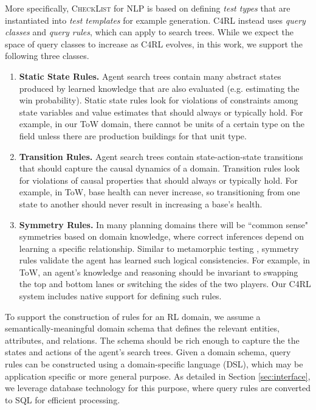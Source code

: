 \documentclass[letterpaper]{article} %
\begin{document}
More specifically, \textsc{CheckList} for NLP is based on defining \emph{test types} that are instantiated into \emph{test templates} for example generation. C4RL instead uses \emph{query classes} and \emph{query rules}, which can apply to search trees. While we expect the space of query classes to increase as C4RL evolves, in this work, we support the following three classes.
\label{sec:query-class}
\begin{enumerate}[itemsep=0pt,topsep=1pt]
    \item 
        \textbf{Static State Rules.} Agent search trees contain many abstract states produced by learned knowledge that are also evaluated 
        (e.g. estimating the win probability). Static state rules look for violations of constraints among state variables and value estimates that should always or typically hold. For example, in our ToW domain, there cannot be units of a certain type on the field unless there are production buildings for that unit type. 
    \item 
        \textbf{Transition Rules.} Agent search trees contain state-action-state transitions that should capture the causal dynamics of a domain. Transition rules look for violations of causal properties that should always or typically hold. For example, in ToW, base health can never increase, so transitioning from one state to another should never result in increasing a base's health. 
    \item
        \textbf{Symmetry Rules.} In many planning domains there will be ``common sense" symmetries based on domain knowledge, where correct inferences depend on learning a specific relationship. Similar to metamorphic testing \cite{6963470}, symmetry rules validate the agent has learned such logical consistencies. For example, in ToW, an agent's knowledge and reasoning should be invariant to swapping the top and bottom lanes or switching the sides of the two players. Our C4RL system includes native support for defining such rules. 
\end{enumerate}

To support the construction of rules for an RL domain, we assume a semantically-meaningful domain schema that defines the relevant entities, attributes, and relations. The schema should be rich enough to capture the the states and actions of the agent's search trees. Given a domain schema, query rules can be constructed using a domain-specific language (DSL), which may be application specific or more general purpose. As detailed in Section \ref{sec:interface}, we leverage database technology for this purpose, where query rules are converted to SQL for efficient processing.
\end{document}
